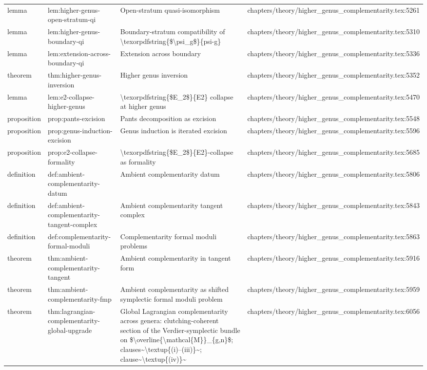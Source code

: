\documentclass[11pt]{article}
\begin{document}
\begin{longtable}{L{0.10\textwidth}L{0.26\textwidth}L{0.42\textwidth}L{0.22\textwidth}}
lemma & lem:higher-genus-op{}en-stratum-qi & Op{}en-stratum quasi-isomorphism & chapters/theory/higher\_genus\_complementarity.tex:5261\\
lemma & lem:higher-genus-boundary-qi & Boundary-stratum compatibility of \textbackslash{}texorpdfstring\{\$\textbackslash{}psi\_g\$\}\{psi-g\} & chapters/theory/higher\_genus\_complementarity.tex:5310\\
lemma & lem:extension-across-boundary-qi & Extension across boundary & chapters/theory/higher\_genus\_complementarity.tex:5336\\
theorem & thm:higher-genus-inversion & Higher genus inversion & chapters/theory/higher\_genus\_complementarity.tex:5352\\
lemma & lem:e2-collapse-higher-genus & \textbackslash{}texorpdfstring\{\$E\_2\$\}\{E2\} collapse at higher genus & chapters/theory/higher\_genus\_complementarity.tex:5470\\
proposition & prop:pants-excision & Pants decomposition as excision & chapters/theory/higher\_genus\_complementarity.tex:5548\\
proposition & prop:genus-induction-excision & Genus induction is iterated excision & chapters/theory/higher\_genus\_complementarity.tex:5596\\
proposition & prop:e2-collapse-formality & \textbackslash{}texorpdfstring\{\$E\_2\$\}\{E2\}-collapse as formality & chapters/theory/higher\_genus\_complementarity.tex:5685\\
definition & def:ambient-complementarity-datum & Ambient complementarity datum & chapters/theory/higher\_genus\_complementarity.tex:5806\\
definition & def:ambient-complementarity-tangent-complex & Ambient complementarity tangent complex & chapters/theory/higher\_genus\_complementarity.tex:5843\\
definition & def:complementarity-formal-moduli & Complementarity formal moduli problems & chapters/theory/higher\_genus\_complementarity.tex:5863\\
theorem & thm:ambient-complementarity-tangent & Ambient complementarity in tangent form & chapters/theory/higher\_genus\_complementarity.tex:5916\\
theorem & thm:ambient-complementarity-fmp & Ambient complementarity as shifted symplectic formal moduli problem & chapters/theory/higher\_genus\_complementarity.tex:5959\\
theorem & thm:lagrangian-complementarity-global-upgrade & Global Lagrangian complementarity across genera: clutching-coherent section of the Verdier-symplectic bundle on \$\textbackslash{}overline\{\textbackslash{}mathcal\{M\}\}\_\{g,n\}\$; clauses\textasciitilde{}\textbackslash{}textup\{(i)--(iii)\}\textasciitilde{}; clause\textasciitilde{}\textbackslash{}textup\{(iv)\}\textasciitilde{} & chapters/theory/higher\_genus\_complementarity.tex:6056\\

\end{longtable}
\end{document}
